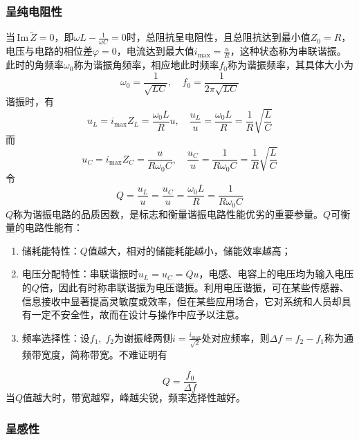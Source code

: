 \documentclass[UTF8]{article}
\def\Im{\mathrm{\,Im}\,}
\theoremstyle{MyLineTheoremStyle} %
\theoremstyle{MyBlockTheoremStyle} %
\theoremstyle{MySubsubsectionStyle} %
\begin{document}
\subsubsection{呈纯电阻性}

当$ \Im \tilde{Z}=0 $，即$ \omega L-\frac{1}{\omega C}=0 $时，总阻抗呈电阻性，且总阻抗达到最小值$ Z_0=R $，电压与电路的相位差$ \varphi=0 $，电流达到最大值$ i_{\max}=\frac uR $，这种状态称为串联谐振。此时的角频率$ \omega_0 $称为谐振角频率，相应地此时频率$ f_0 $称为谐振频率，其具体大小为
\begin{equation}
\omega_0=\frac{1}{\sqrt{LC}},\quad f_0=\frac{1}{2\pi\sqrt{LC}}
\end{equation}
谐振时，有
\begin{equation}
u_L=i_{\max} Z_L=\frac{\omega_0L}{R}u,\quad \frac{u_L}{u}=\frac{\omega_0L}{R}=\frac1R\sqrt{\frac LC}
\end{equation}
而
\begin{equation}
u_C=i_{\max} Z_C=\frac{u}{R\omega_0C},\quad\frac{u_C}{u}=\frac{1}{R\omega_0C}=\frac1R\sqrt{\frac LC}
\end{equation}
令
\begin{equation}
Q=\frac{u_L}{u}=\frac{u_C}{u}=\frac{\omega_0L}{R}=\frac{1}{R\omega_0C}
\end{equation}
$ Q $称为谐振电路的品质因数，是标志和衡量谐振电路性能优劣的重要参量。$ Q $可衡量的电路性能有：
\begin{enumerate}
\item 储耗能特性：$ Q $值越大，相对的储能耗能越小，储能效率越高；
\item 电压分配特性：串联谐振时$ u_L=u_C=Qu $，电感、电容上的电压均为输入电压的$ Q $倍，因此有时称串联谐振为电压谐振。利用电压谐振，可在某些传感器、信息接收中显著提高灵敏度或效率，但在某些应用场合，它对系统和人员却具有一定不安全性，故而在设计与操作中应予以注意。
\item 频率选择性：设$ f_1,\;f_2 $为谢振峰两侧$ i=\frac{i_{\max}}{\sqrt 2} $处对应频率，则$ \Delta f=f_2-f_1 $称为通频带宽度，简称带宽。不难证明有
\end{enumerate}


\begin{equation}
Q=\frac{f_0}{\Delta f}
\end{equation}
当$ Q $值越大时，带宽越窄，峰越尖锐，频率选择性越好。

\subsubsection{呈感性}
\end{document}
